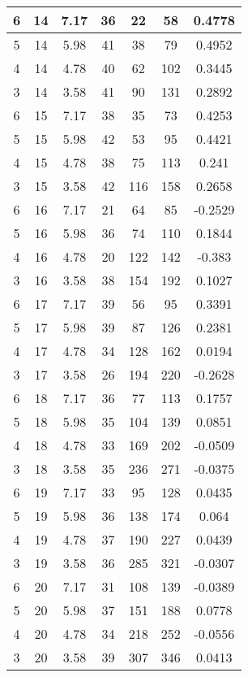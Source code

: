 \documentclass[letterpaper, 12pt]{article}
\begin{document}
\begin{longtable}{|c|c|c|c|c|c|c|}
\hline
6 & 14 & 7.17 & 36 & 22 & 58 & 0.4778 \\
\hline
5 & 14 & 5.98 & 41 & 38 & 79 & 0.4952 \\
\hline
4 & 14 & 4.78 & 40 & 62 & 102 & 0.3445 \\
\hline
3 & 14 & 3.58 & 41 & 90 & 131 & 0.2892 \\
\hline
6 & 15 & 7.17 & 38 & 35 & 73 & 0.4253 \\
\hline
5 & 15 & 5.98 & 42 & 53 & 95 & 0.4421 \\
\hline
4 & 15 & 4.78 & 38 & 75 & 113 & 0.241 \\
\hline
3 & 15 & 3.58 & 42 & 116 & 158 & 0.2658 \\
\hline
6 & 16 & 7.17 & 21 & 64 & 85 & -0.2529 \\
\hline
5 & 16 & 5.98 & 36 & 74 & 110 & 0.1844 \\
\hline
4 & 16 & 4.78 & 20 & 122 & 142 & -0.383 \\
\hline
3 & 16 & 3.58 & 38 & 154 & 192 & 0.1027 \\
\hline
6 & 17 & 7.17 & 39 & 56 & 95 & 0.3391 \\
\hline
5 & 17 & 5.98 & 39 & 87 & 126 & 0.2381 \\
\hline
4 & 17 & 4.78 & 34 & 128 & 162 & 0.0194 \\
\hline
3 & 17 & 3.58 & 26 & 194 & 220 & -0.2628 \\
\hline
6 & 18 & 7.17 & 36 & 77 & 113 & 0.1757 \\
\hline
5 & 18 & 5.98 & 35 & 104 & 139 & 0.0851 \\
\hline
4 & 18 & 4.78 & 33 & 169 & 202 & -0.0509 \\
\hline
3 & 18 & 3.58 & 35 & 236 & 271 & -0.0375 \\
\hline
6 & 19 & 7.17 & 33 & 95 & 128 & 0.0435 \\
\hline
5 & 19 & 5.98 & 36 & 138 & 174 & 0.064 \\
\hline
4 & 19 & 4.78 & 37 & 190 & 227 & 0.0439 \\
\hline
3 & 19 & 3.58 & 36 & 285 & 321 & -0.0307 \\
\hline
6 & 20 & 7.17 & 31 & 108 & 139 & -0.0389 \\
\hline
5 & 20 & 5.98 & 37 & 151 & 188 & 0.0778 \\
\hline
4 & 20 & 4.78 & 34 & 218 & 252 & -0.0556 \\
\hline
3 & 20 & 3.58 & 39 & 307 & 346 & 0.0413 \\
\hline
\end{longtable}
\end{document}
